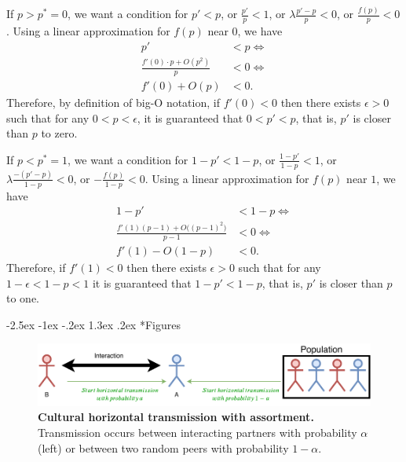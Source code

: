 \documentclass[12pt]{extarticle}
\makeatletter
\renewcommand\section{\@startsection {section}{1}{\z@}%
     {-2.5ex \@plus -1ex \@minus -.2ex}%
     {1.3ex \@plus.2ex}%
    {\Large\bfseries}}
\makeatother
\begin{document}
{\begin{appendices}
If $p>p^*=0$, we want a condition for $p'<p$, or
$\frac{p'}{p}<1$, or
$\lambda \frac{p'-p}{p} < 0$, or
$\frac{f(p)}{p} < 0$.
Using a linear approximation for $f(p)$ near $0$, we have
\begin{equation}\begin{aligned}
p' &< p \Leftrightarrow \\
\frac{f'(0) \cdot p + O(p^2)}{p} &< 0 \Leftrightarrow \\
f'(0) + O(p) &< 0.
\end{aligned}\end{equation}
Therefore, by definition of big-O notation, if $f'(0)<0$ then there exists $\epsilon>0$ such that for any $0<p<\epsilon$, it is guaranteed that $0<p'<p$, that is, $p'$ is closer than $p$ to zero.

If $p<p^*=1$, we want a condition for $1-p' < 1-p$, or
$\frac{1-p'}{1-p}<1$, or
$\lambda \frac{-(p'-p)}{1-p} < 0$, or
$-\frac{f(p)}{1-p} < 0$.
Using a linear approximation for $f(p)$ near $1$, we have
\begin{equation}\begin{aligned}
1-p' &< 1-p  \Leftrightarrow \\
\frac{f'(1)(p-1) + O\big((p-1)^2\big)}{p-1} &< 0 \Leftrightarrow \\
f'(1) - O(1-p) &< 0.
\end{aligned}\end{equation}
Therefore, if $f'(1)<0$ then there exists $\epsilon>0$ such that for any $1-\epsilon<1-p<1$ it is guaranteed that $1-p'<1-p$, that is, $p'$ is closer than $p$ to one.
\end{appendices}






\section*{Figures}
\begin{figure}[thb]
  \centering
  \includegraphics[scale=1]{figure1.pdf}
  \caption{\textbf{Cultural horizontal transmission with assortment.} Transmission occurs between interacting partners with probability $\alpha$ (left) or between two random peers with probability $1-\alpha$.}
  \label{fig:horizontal}
\end{figure}



}
\end{document}
